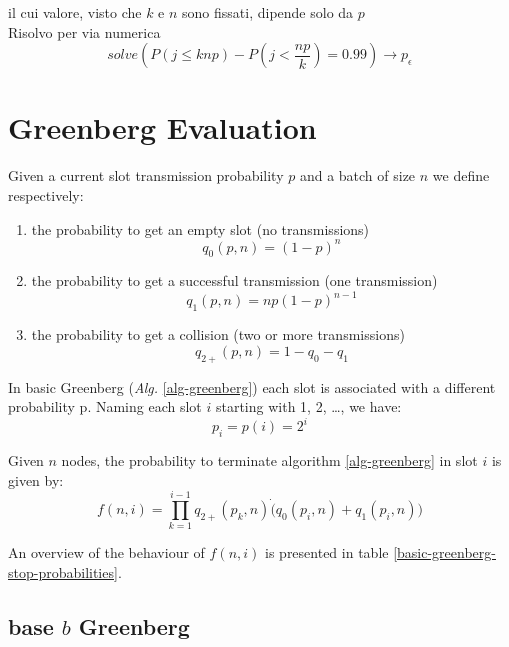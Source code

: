 \documentclass[12pt,a4paper,twocolumns]{report}
\newcommand{\pc}{p_{\epsilon}}
\begin{document}
il cui valore, visto che $k$ e $n$ sono fissati, dipende solo da $p$\\ 
Risolvo per via numerica
\begin{equation}
solve \left(P(j \leq knp ) - P(j < \frac{np}{k}) = 0.99 \right) \to \pc
\end{equation}

\section{Greenberg Evaluation}
Given a current slot transmission probability $p$ and a batch of size $n$ we define respectively:
\begin{enumerate}
\item the probability to get an empty slot (no transmissions)
\begin{equation}q_{0}(p,n)=(1-p)^{n}\end{equation} 
\item the probability to get a successful transmission (one transmission)
\begin{equation}q_{1}(p,n)=n p (1-p)^{n-1} \end{equation} 
\item the probability to get a collision (two or more transmissions)
\begin{equation}q_{2+}(p,n)=1-q_{0}-q_{1}\end{equation}
\end{enumerate}

In basic Greenberg (\emph{Alg.} \ref{alg-greenberg}) each slot is associated with a different probability p. Naming each slot $i$ starting with 1, 2, \dots, we have:
\begin{equation}
	p_{i}=p(i)=2^{i}
\end{equation}

Given $n$ nodes, the probability to terminate algorithm \ref{alg-greenberg} in slot $i$ is given by:
\begin{equation}
f(n,i)=\prod_{k=1}^{i-1}q_{2+}(p_{k},n) \dot (q_{0}(p_{i},n)+q_{1}(p_{i},n))  
\label{eq:bgstopprobability}
\end{equation}

An overview of the behaviour of $f(n,i)$ is presented in table \ref{basic-greenberg-stop-probabilities}.

\subsection{base $b$ Greenberg}
\end{document}
